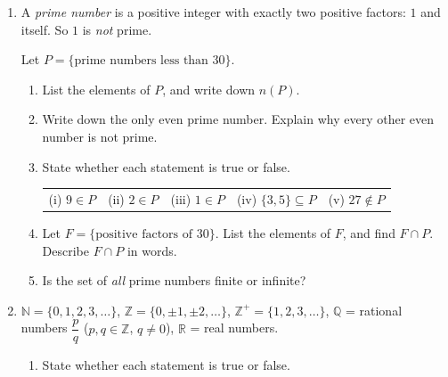 \documentclass[12pt, twoside]{article}
\begin{document}
\begin{enumerate}[itemsep=0.15cm]

\item[1.]
A \emph{prime number} is a positive integer with exactly two positive factors:
$1$ and itself. So $1$ is \emph{not} prime.

Let $P = \{\text{prime numbers less than } 30\}$.

\begin{enumerate}[itemsep=0.15cm]
  \item List the elements of $P$, and write down $n(P)$. \vfill
  \item Write down the only even prime number. Explain why every other
  even number is not prime. \vfill
  \item State whether each statement is true or false.

  \begin{tabular}{@{}p{}p{}p{}p{}p{}}
  (i) $9 \in P$ & (ii) $2 \in P$ & (iii) $1 \in P$ &
  (iv) $\{3, 5\} \subseteq P$ & (v) $27 \notin P$
  \end{tabular}
  \vfill
  \item Let $F = \{\text{positive factors of } 30\}$. List the elements of
  $F$, and find $F \cap P$. Describe $F \cap P$ in words. \vfill
  \item Is the set of \emph{all} prime numbers finite or infinite? \vfill
\end{enumerate}

\newpage

\item[2.]
$\mathbb{N} = \{0, 1, 2, 3, \ldots\}$, \quad
$\mathbb{Z} = \{0, \pm 1, \pm 2, \ldots\}$, \quad
$\mathbb{Z}^{+} = \{1, 2, 3, \ldots\}$, \quad
$\mathbb{Q}$ = rational numbers $\dfrac{p}{q}$ ($p, q \in \mathbb{Z}$,
$q \neq 0$), \quad $\mathbb{R}$ = real numbers.

\begin{enumerate}[itemsep=0.15cm]
  \item State whether each statement is true or false.


\end{enumerate}
\end{enumerate}
\end{document}
